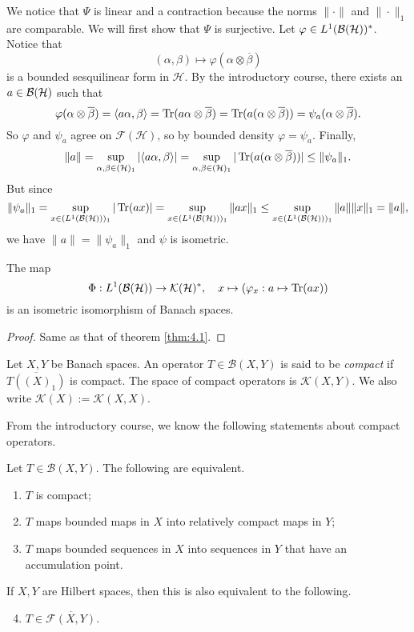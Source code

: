 \begin{myproof}
  We notice that $\Psi$ is linear and a contraction because the norms $\|\cdot \|$
  and $\| \cdot \|_1$ are comparable. We will first show that $\Psi$ is surjective.
  Let $\varphi \in L^1 (\operatorname{\mathcal{B} (\mathcal{H})})^*$. Notice that 
  $$(\alpha, \beta) \mapsto \varphi(\alpha \otimes \overline{\beta})$$
  is a bounded sesquilinear form in $\mathcal{H}$. By the introductory course, there exists 
  an $a \in \operatorname{\mathcal{B} (\mathcal{H})}$ such that 
  $$\varphi(\alpha \otimes \overline{\beta}) = \langle a \alpha, \beta \rangle = \operatorname{Tr} (a\alpha \otimes \overline{\beta}) = \operatorname{Tr} (a(\alpha \otimes \overline{\beta})) = \psi_a (\alpha \otimes \overline{\beta}).$$
  So $\varphi$ and $\psi_a$ agree on $\mathcal{F} (\mathcal{H})$, so by bounded density $\varphi = \psi_a$.
  Finally, 
  $$\| a\| = \sup_{\alpha, \beta \in (\mathcal{H})_1} |\langle a \alpha, \beta \rangle| = \sup_{\alpha, \beta \in (\mathcal{H})_1} |\operatorname{Tr} (a (\alpha \otimes \overline{\beta})) | \leq \| \psi_a \|_1.$$
  But since 
  $$\| \psi_a \|_1 = \sup_{x \in (L^1(\operatorname{\mathcal{B} (\mathcal{H})}))_1} |\operatorname{Tr} (ax)| = \sup_{x \in (L^1(\operatorname{\mathcal{B} (\mathcal{H})}))_1} \| ax \|_1 \leq \sup_{x \in (L^1(\operatorname{\mathcal{B} (\mathcal{H})}))_1} \| a \| \|x \|_1 = \| a\|,$$
  we have $\| a\| = \| \psi_a\|_1$ and $\psi$ is isometric.
\end{myproof}

\begin{corollary}
  The map $$\Phi: L^1 (\operatorname{\mathcal{B} (\mathcal{H})}) \to \mathcal{K} (\mathcal{H})^*, \quad x \mapsto (\varphi_x: a \mapsto \operatorname{Tr} (ax))$$
  is an isometric isomorphism of Banach spaces.
\end{corollary}

\begin{proof}
  Same as that of theorem \ref{thm:4.1}.
\end{proof}

\begin{definition}
  Let $X, Y$ be Banach spaces. An operator $T\in \mathcal{B}(X, Y)$ is said to be \emph{compact}
  if $\overline{T((X)_1)}$ is compact. The space of compact operators is $\mathcal{K} (X, Y)$.
  We also write $\mathcal{K} (X) := \mathcal{K} (X, X)$.
\end{definition}

From the introductory course, we know the following statements about compact operators.

\begin{proposition}
  Let $T \in \mathcal{B}(X, Y)$. The following are equivalent.
  \begin{enumerate}
    \item $T$ is compact;
    \item $T$ maps bounded maps in $X$ into relatively compact maps in $Y$;
    \item $T$ maps bounded sequences in $X$ into sequences in $Y$ that have an accumulation point.
  \end{enumerate}
  If $X, Y$ are Hilbert spaces, then this is also equivalent to the following.
  \begin{enumerate}\setcounter{enumi}{3}
    \item $T \in \overline{\mathcal{F}(X, Y)}$.
  \end{enumerate}
\end{proposition}


